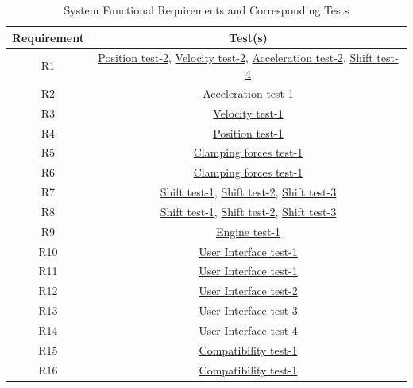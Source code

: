 \documentclass[12pt, titlepage]{article}
\begin{document}
\begin{table}[H]
\centering
  \begin{tabular}{|c|c|}
    \hline
    \textbf{Requirement} & \textbf{Test(s)} \\ \hline
    R1 & \textcolor{blue}{\hyperlink{PositionTest-2}{Position test-2}}, \textcolor{blue}{\hyperlink{Velocity test-2}{Velocity test-2}}, \textcolor{blue}{\hyperlink{Acceleration test-2}{Acceleration test-2}}, \textcolor{blue}{\hyperlink{Shift test-4}{Shift test-4}} \\ \hline
    R2 & \textcolor{blue}{\hyperlink{Acceleration test-1}{Acceleration test-1}} \\ \hline
    R3 & \textcolor{blue}{\hyperlink{Velocity test-1}{Velocity test-1}} \\ \hline
    R4 & \textcolor{blue}{\hyperlink{PositionTest-1}{Position test-1}} \\ \hline
    R5 & \textcolor{blue}{\hyperlink{Clamping forces test-1}{Clamping forces test-1}}  \\ \hline
    R6 & \textcolor{blue}{\hyperlink{Clamping forces test-1}{Clamping forces test-1}}  \\ \hline
    R7 & \textcolor{blue}{\hyperlink{Shift test-1}{Shift test-1}}, \textcolor{blue}{\hyperlink{Shift test-2}{Shift test-2}}, \textcolor{blue}{\hyperlink{Shift test-3}{Shift test-3}} \\ \hline
    R8 & \textcolor{blue}{\hyperlink{Shift test-1}{Shift test-1}}, \textcolor{blue}{\hyperlink{Shift test-2}{Shift test-2}}, \textcolor{blue}{\hyperlink{Shift test-3}{Shift test-3}} \\ \hline
    R9 & \textcolor{blue}{\hyperlink{Engine test-1}{Engine test-1}}\\ \hline
    R10 & \textcolor{blue}{\hyperlink{User Interface test-1}{User Interface test-1}} \\ \hline
    R11 & \textcolor{blue}{\hyperlink{User Interface test-1}{User Interface test-1}} \\ \hline
    R12 & \textcolor{blue}{\hyperlink{User Interface test-2}{User Interface test-2}} \\ \hline
    R13 & \textcolor{blue}{\hyperlink{User Interface test-3}{User Interface test-3}} \\ \hline
    R14 & \textcolor{blue}{\hyperlink{User Interface test-4}{User Interface test-4}} \\ \hline
    R15 & \textcolor{blue}{\hyperlink{Compatibility test-1}{Compatibility test-1}} \\ \hline
    R16 & \textcolor{blue}{\hyperlink{Compatibility test-1}{Compatibility test-1}} \\ \hline
    \end{tabular}
    \caption{System Functional Requirements and Corresponding Tests}
    \label{tab:requirements_tests}
\end{table}
\end{document}

